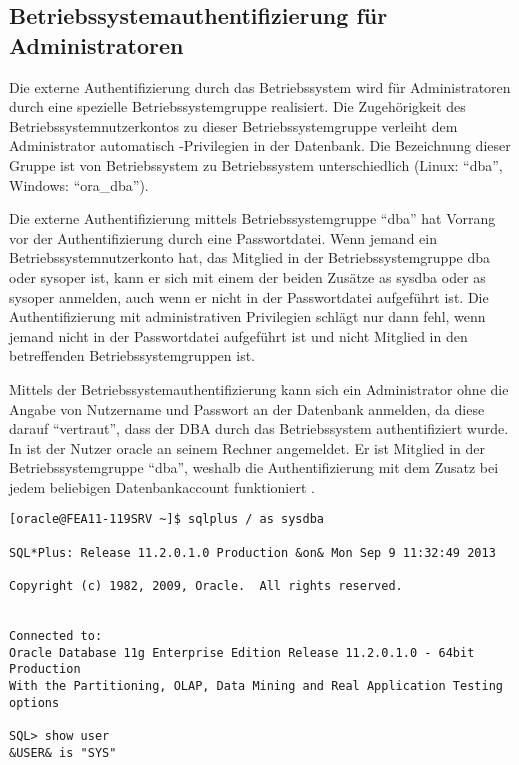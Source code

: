       \subsection{Betriebssystemauthentifizierung für Administratoren}
        Die externe Authentifizierung durch das Betriebssystem wird für Administratoren durch eine spezielle Betriebssystemgruppe realisiert. Die Zugehörigkeit des Betriebssystemnutzerkontos zu dieser Betriebssystemgruppe verleiht dem Administrator automatisch -Privilegien in der Datenbank. Die Bezeichnung dieser Gruppe ist von Betriebssystem zu Betriebssystem unterschiedlich (Linux: \enquote{dba}, Windows: \enquote{ora\_dba}).
        \begin{merke}
          Die externe Authentifizierung mittels Betriebssystemgruppe \enquote{dba} hat Vorrang vor der Authentifizierung durch eine Passwortdatei. Wenn jemand ein Betriebssystemnutzerkonto hat, das Mitglied in der Betriebssystemgruppe dba oder sysoper ist, kann er sich mit einem der beiden Zusätze as sysdba oder as sysoper anmelden, auch wenn er nicht in der Passwortdatei aufgeführt ist. Die Authentifizierung mit administrativen Privilegien schlägt nur dann fehl, wenn jemand nicht in der Passwortdatei aufgeführt ist und nicht Mitglied in den betreffenden Betriebssystemgruppen ist.
        \end{merke}
        Mittels der Betriebssystemauthentifizierung kann sich ein Administrator ohne die Angabe von Nutzername und Passwort an der Datenbank anmelden, da diese darauf \enquote{vertraut}, dass der DBA durch das Betriebssystem authentifiziert wurde. In  ist der Nutzer oracle an seinem Rechner angemeldet. Er ist Mitglied in der Betriebssystemgruppe \enquote{dba}, weshalb die Authentifizierung mit dem Zusatz  bei jedem beliebigen Datenbankaccount funktioniert .

          \begin{lstlisting}[caption={Die Betriebssystemauthentifizierung für
          Administratoren},label=admin215,language=oracle_sql,alsolanguage=sqlplus]
[oracle@FEA11-119SRV ~]$ sqlplus / as sysdba

SQL*Plus: Release 11.2.0.1.0 Production &on& Mon Sep 9 11:32:49 2013

Copyright (c) 1982, 2009, Oracle.  All rights reserved.


Connected to:
Oracle Database 11g Enterprise Edition Release 11.2.0.1.0 - 64bit Production
With the Partitioning, OLAP, Data Mining and Real Application Testing options

SQL> show user
&USER& is "SYS"
          \end{lstlisting}
          \begin{literaturinternet}
            \item \cite{i1006534}
          \end{literaturinternet}
